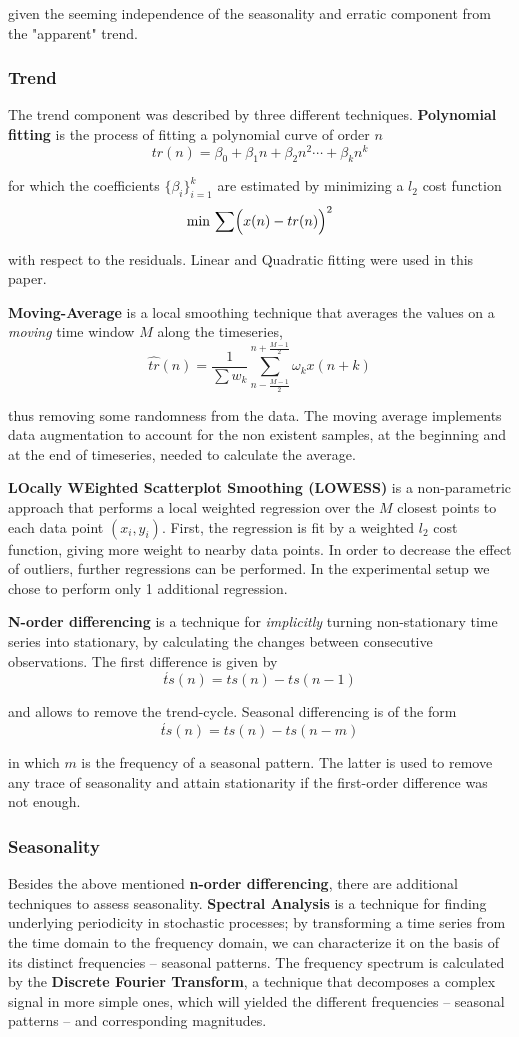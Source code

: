 \documentclass[conference]{IEEEtran}
\begin{document}
given the seeming independence of the seasonality and erratic component from the "apparent" trend.
\subsubsection{Trend}
The trend component was described by three different techniques. \textbf{Polynomial fitting} is the process of fitting a polynomial curve of order $n$
\[
tr(n) = \beta _0+\beta_ 1n+\beta_ 2n^2\dotsb+\beta _kn^k
\]

for which the coefficients $\lbrace\beta_i\rbrace^k_{i=1}$ are estimated by minimizing a $l_2$ cost function
\[
\min\,\sum\Bigl(x(n)-tr(n)\Bigr)^2
\]

with respect to the residuals. Linear and Quadratic fitting were used in this paper.

\textbf{Moving-Average} is a local smoothing technique that averages the values on a \textit{moving} time window $M$ along the timeseries,
\[
\hat{tr}(n)=\frac{1}{\sum w_k}\sum^{n+\frac{M-1}{2}}_{n-\frac{M-1}{2}} \omega_kx(n+k)
\]

thus removing some randomness from the data. The moving average implements data augmentation to account for the non existent samples, at the beginning and at the end of timeseries, needed to calculate the average.

\textbf{LOcally WEighted Scatterplot Smoothing (LOWESS)} is a non-parametric approach that performs a local weighted regression over the $M$ closest points to each data point $(x_i,y_i)$. First, the regression is fit by a weighted $l_2$ cost function, giving more weight to nearby data points. In order to decrease the effect of outliers, further regressions can be performed. In the experimental setup we chose to perform only 1 additional regression.

\textbf{N-order differencing} is a technique for \textit{implicitly} turning non-stationary time series into stationary, by calculating the changes between consecutive observations. The first difference is given by
\[
\acute{ts}(n) = ts(n) - ts(n-1) 
\]

and allows to remove the trend-cycle. Seasonal differencing is of the form
\[
\acute{ts}(n) = ts(n) - ts(n-m)
\]

in which $m$ is the frequency of a seasonal pattern. The latter is used to remove any trace of seasonality and attain stationarity if the first-order difference was not enough.

\subsubsection{Seasonality}
Besides the above mentioned \textbf{n-order differencing}, there are additional techniques to assess seasonality. \textbf{Spectral Analysis} is a technique for finding underlying periodicity in stochastic processes; by transforming a time series from the time domain to the frequency domain, we can characterize it on the basis of its distinct frequencies -- seasonal patterns. The frequency spectrum is calculated by the \textbf{Discrete Fourier Transform}, a technique that decomposes a complex signal in more simple ones, which will yielded the different frequencies -- seasonal patterns -- and corresponding magnitudes.
\end{document}
